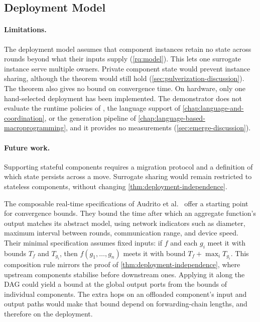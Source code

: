 \subsection{Deployment Model}
\label{subsec:limits-model}

\paragraph{Limitations.}
The deployment model assumes that component instances retain no state across rounds beyond what their inputs supply (\cref{rq:model}).
This lets one surrogate instance serve multiple owners.
Private component state would prevent instance sharing, although the theorem would still hold (\cref{sec:pulverization-discussion}).
The theorem also gives no bound on convergence time.
On hardware, only one hand-selected deployment has been implemented.
The demonstrator does not evaluate the runtime policies of ,
the language support of \cref{chap:language-and-coordination}, or the generation pipeline of \cref{chap:language-based-macroprogramming},
and it provides no measurements (\cref{sec:emerge-discussion}).

\paragraph{Future work.}
Supporting stateful components requires a migration protocol and a definition of which state persists across a move.
Surrogate sharing would remain restricted to stateless components,
without changing \cref{thm:deployment-independence}.

The composable real-time specifications of Audrito et al.~\cite{DBLP:conf/isola/AudritoDT24}
offer a starting point for convergence bounds.
They bound the time after which an aggregate function's output matches its abstract model,
using network indicators such as diameter, maximum interval between rounds, communication range, and device speed.
Their minimal specification assumes fixed inputs:
if $f$ and each $g_i$ meet it with bounds $T_f$ and $T_{g_i}$,
then $f(g_1, \dots, g_n)$ meets it with bound $T_f + \max_i T_{g_i}$.
%
This composition rule mirrors the proof of \cref{thm:deployment-independence},
where upstream components stabilise before downstream ones.
Applying it along the \ac{DAG} could yield a bound at the global output ports from the bounds of individual components.
The extra hops on an offloaded component's input and output paths would make that bound depend on forwarding-chain lengths,
and therefore on the deployment.

